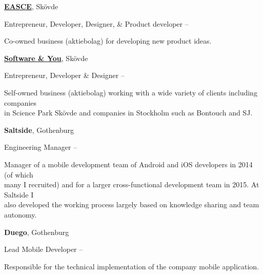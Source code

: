 \documentclass[letterpaper,MMMyyyy,nonstopmode]{resume}
\begin{document}
\begin{Body}
\begin{comment}
\Gap
\BulletItem
Supervisor (part-time)
\hfill
\DatestampYMD{2006}{01}{01} --
\DatestampYMD{2006}{06}{01}
\begin{Detail}
\SubBulletItem
Project development and tutoring in Software Engineering
\end{Detail}
\end{comment}

\BigGap
\Entry
\href{http://easce.com/}
{\textbf{EASCE}}, Skövde

\Gap
\BulletItem
Entrepreneur, Developer, Designer, \& Product developer
\hfill
{} --
\begin{Detail}
\SubBulletItem
Co-owned business (aktiebolag) for developing new product ideas. 
\end{Detail}

\BigGap
\Entry
\href{http://softwareyou.se/}
{\textbf{Software \& You}}, Skövde

\Gap
\BulletItem
Entrepreneur, Developer \& Designer
\hfill
{} --
\begin{Detail}
\SubBulletItem
Self-owned business (aktiebolag) working with a wide variety of clients including companies\\in Science Park Skövde and companies in Stockholm such as Bontouch and SJ. 
\end{Detail}

\BigGap
\Entry
\textbf{Saltside}, Gothenburg

\Gap
\BulletItem
Engineering Manager
\hfill
{} --

\begin{Detail}
\SubBulletItem
Manager of a mobile development team of Android and iOS developers in 2014 (of which\\many I recruited) and for a larger cross-functional development team in 2015. At Saltside I\\also developed the working process largely based on knowledge sharing and team autonomy.
\end{Detail}

\BigGap
\Entry
\textbf{Duego}, Gothenburg

\Gap
\BulletItem
Lead Mobile Developer
\hfill
{} --

\begin{Detail}
\SubBulletItem
Responsible for the technical implementation of the company mobile application.
\end{Detail}


\end{Body}
\end{document}
